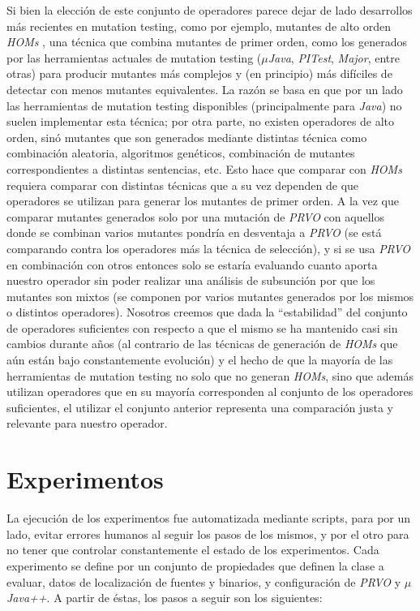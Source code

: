 Si bien la elecci\'on de este conjunto de operadores parece dejar de lado desarrollos m\'as recientes en mutation testing, como por ejemplo, mutantes de alto orden \emph{HOMs} \cite{bibliography.mutation.highorder.JiaH09}, una t\'ecnica que combina mutantes de primer orden, como los generados por las herramientas actuales de mutation testing (\emph{$\mu$Java}, \emph{PITest}, \emph{Major}, entre otras) para producir mutantes m\'as complejos y (en principio) m\'as dif\'iciles de detectar con menos mutantes equivalentes. La raz\'on se basa en que por un lado las herramientas de mutation testing disponibles (principalmente para \emph{Java}) no suelen implementar esta t\'ecnica; por otra parte, no existen operadores de alto orden, sin\'o mutantes que son generados mediante distintas t\'ecnica como combinaci\'on aleatoria, algoritmos gen\'eticos, combinaci\'on de mutantes correspondientes a distintas sentencias, etc. Esto hace que comparar con \emph{HOMs} requiera comparar con distintas t\'ecnicas que a su vez dependen de que operadores se utilizan para generar los mutantes de primer orden. A la vez que comparar mutantes generados solo por una mutaci\'on de \emph{PRVO} con aquellos donde se combinan varios mutantes pondr\'ia en desventaja a \emph{PRVO} (se est\'a comparando contra los operadores m\'as la t\'ecnica de selecci\'on), y si se usa \emph{PRVO} en combinaci\'on con otros entonces solo se estar\'ia evaluando cuanto aporta nuestro operador sin poder realizar una an\'alisis de subsunci\'on por que los mutantes son mixtos (se componen por varios mutantes generados por los mismos o distintos operadores). Nosotros creemos que dada la ``estabilidad'' del conjunto de operadores suficientes con respecto a que el mismo se ha mantenido casi sin cambios durante a\~nos (al contrario de las t\'ecnicas de generaci\'on de \emph{HOMs} que a\'un est\'an bajo constantemente evoluci\'on) y el hecho de que la mayor\'ia de las herramientas de mutation testing no solo que no generan \emph{HOMs}, sino que adem\'as utilizan operadores que en su mayor\'ia corresponden al conjunto de los operadores suficientes, el utilizar el conjunto anterior representa una comparaci\'on justa y relevante para nuestro operador.

\section{Experimentos}
\label{sec:evaluation.steps}

La ejecuci\'on de los experimentos fue automatizada mediante scripts, para por un lado, evitar errores humanos al seguir los pasos de los mismos, y por el otro para no tener que controlar constantemente el estado de los experimentos. Cada experimento se define por un conjunto de propiedades que definen la clase a evaluar, datos de localizaci\'on de fuentes y binarios, y configuraci\'on de \emph{PRVO} y \emph{$\mu$Java++}. A partir de \'estas, los pasos a seguir son los siguientes:

